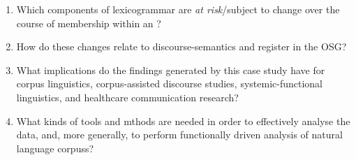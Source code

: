 \begin{enumerate}\setlength\itemsep{0em}
\item Which components of \gls{lexicogrammar} are \emph{at risk}\slash subject to change over the course of membership within an ?
\item How do these changes relate to \glspl{discourse-semantic} and register in the \gls{OSG}?
\item What implications do the findings generated by this case study have for corpus linguistics, corpus\hyp{}assisted discourse studies, systemic\hyp{}functional linguistics, and healthcare communication research?
\item What kinds of tools and mthods are needed in order to effectively analyse the data, and, more generally, to perform functionally driven analysis of natural language \glspl{corpus}?
\end{enumerate}
